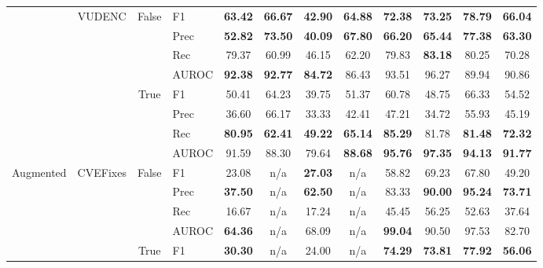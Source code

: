 \documentclass{ieeeaccess}
\begin{document}
\begin{table}[h]
\begin{tabular}{|c|c|c|lcccccccc|}
&\multirow{8}{*}{VUDENC}
&\multirow{4}{*}{False}
&     F1 &\textbf{63.42}&\textbf{66.67}&\textbf{42.90}&\textbf{64.88}&\textbf{72.38}&\textbf{73.25}& \textbf{78.79}&\textbf{66.04}\\

&&    &\rowcolor{gray!15}   Prec&\textbf{52.82}&\textbf{73.50}&\textbf{40.09}&\textbf{67.80}&\textbf{66.20}&\textbf{65.44}& \textbf{77.38}&\textbf{63.30}\\

&&    &Rec&79.37&60.99&46.15&62.20&79.83&\textbf{83.18}& 80.25&70.28\\
  
&&    &\rowcolor{gray!15}    AUROC &\textbf{92.38}&\textbf{92.77}&\textbf{84.72}&86.43&93.51&96.27& 89.94&90.86\\
\cline{3-12}
&&\multirow{4}{*}{True}
&     F1 &50.41&64.23&39.75&51.37&60.78&48.75& 66.33&54.52\\   
   
&&    &\rowcolor{gray!15}   Prec&36.60&66.17&33.33&42.41&47.21&34.72& 55.93&45.19\\   

&&    &Rec&\textbf{80.95}&\textbf{62.41}&\textbf{49.22}&\textbf{65.14}&\textbf{85.29}&81.78& \textbf{81.48}&\textbf{72.32}\\

&&    &\rowcolor{gray!15}    AUROC&91.59&88.30&79.64&\textbf{88.68}&\textbf{95.76}&\textbf{97.35}& \textbf{94.13}&\textbf{91.77}\\
\hline

\multirow{16}{*}{Augmented}
&\multirow{8}{*}{CVEFixes}
&\multirow{4}{*}{False}
&     F1 &23.08 & n/a & \textbf{27.03}& n/a & 58.82& 69.23& 67.80&49.20\\

&&    &\rowcolor{gray!15}   Prec&\textbf{37.50} & n/a & \textbf{62.50} & n/a & 83.33& \textbf{90.00}& \textbf{95.24}&\textbf{73.71} \\

&&    &Rec&16.67 & n/a & 17.24& n/a & 45.45& 56.25& 52.63&37.64\\
 
&&    &\rowcolor{gray!15}    AUROC &\textbf{64.36} & n/a & 68.09& n/a & \textbf{99.04}& 90.50& 97.53&82.70\\
\cline{3-12}

&&\multirow{4}{*}{True}
&     F1 &\textbf{30.30}& n/a & 24.00& n/a & \textbf{74.29}& \textbf{73.81}& \textbf{77.92}&\textbf{56.06}\\


\end{tabular}
\end{table}
\end{document}
